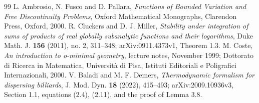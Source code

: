 \begin{thebibliography}{99}
 L. Ambrosio, N. Fusco and D. Pallara,
\emph{Functions of Bounded Variation and Free Discontinuity Problems},
Oxford Mathematical Monographs, Clarendon Press, Oxford, 2000.
 R. Cluckers and D. J. Miller,
\emph{Stability under integration of sums of products of real globally
subanalytic functions and their logarithms}, Duke Math. J.
\textbf{156} (2011), no. 2, 311--348; arXiv:0911.4373v1,
Theorem 1.3.
 M. Coste, \emph{An introduction to o-minimal geometry},
lecture notes, November 1999; Dottorato di Ricerca in Matematica,
Universit\`a di Pisa, Istituti Editoriali e Poligrafici Internazionali, 2000.
 V. Baladi and M. F. Demers,
\emph{Thermodynamic formalism for dispersing billiards},
J. Mod. Dyn. \textbf{18} (2022), 415--493;
arXiv:2009.10936v3, Section 1.1, equations (2.4), (2.11), and the proof of Lemma 3.8.
\end{thebibliography}
